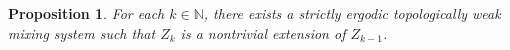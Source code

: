 \documentclass[12pt]{amsart}
\theoremstyle{definition}
\theoremstyle{plain}
\newtheorem{proposition}[theorem]{Proposition}
\theoremstyle{definition}
\numberwithin{equation}{section}
\begin{document}


\begin{proposition} \label{nontrivial measurable nils but trivial topological nils}
    For each $k\in \mathbb{N}$, there exists a strictly ergodic topologically weak mixing system such that $Z_k$ is a nontrivial extension of $Z_{k-1}$.
\end{proposition}
\end{document}
